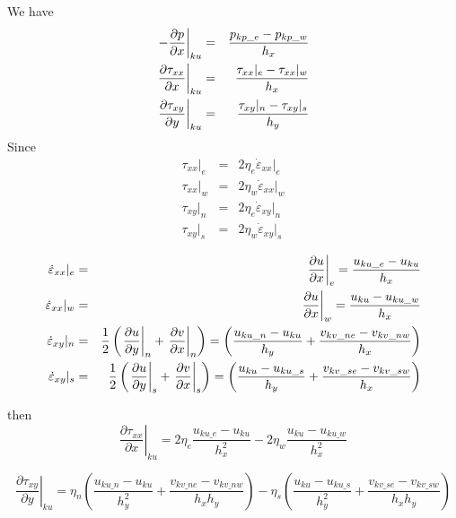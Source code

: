 We have
\begin{eqnarray}
\left. -\frac{\partial p}{\partial x} \right|_{ku} 
&=& \frac{p_{kp\_e}-p_{kp\_w}}{h_x} \nonumber\\
\left. \frac{\partial \tau_{xx}}{\partial x}  \right|_{ku} 
&=&
\frac{\tau_{xx}|_e - \tau_{xx}|_w}{h_x} \nonumber\\
\left. \frac{\partial \tau_{xy}}{\partial y}  \right|_{ku} 
&=&
\frac{\tau_{xy}|_n - \tau_{xy}|_s}{h_y}
\end{eqnarray}
Since
\begin{eqnarray}
\tau_{xx}|_e &=& 2 \eta_e \dot\varepsilon_{xx}|_e \\
\tau_{xx}|_w &=& 2 \eta_w \dot\varepsilon_{xx}|_w \\
\tau_{xy}|_n &=& 2 \eta_e \dot\varepsilon_{xy}|_n \\
\tau_{xy}|_s &=& 2 \eta_w \dot\varepsilon_{xy}|_s
\end{eqnarray}





\begin{eqnarray}
\dot\varepsilon_{xx}|_e 
&=& \left.\frac{\partial u}{\partial x} \right|_e
 =\frac{u_{ku\_e}-u_{ku}  }{h_x}
\nonumber\\
\dot\varepsilon_{xx}|_w 
&=& \left.\frac{\partial u}{\partial x} \right|_w
=\frac{u_{ku}-u_{ku\_w}  }{h_x}
\nonumber\\
\dot\varepsilon_{xy}|_n &=&  
\frac12 \left( 
\left.\frac{\partial u}{\partial y} \right|_n
+ 
\left.\frac{\partial v}{\partial x} \right|_n \right)
=\left(
\frac{u_{ku\_n}-u_{ku}  }{h_y}
+
\frac{v_{kv\_ne}-v_{kv\_nw}  }{h_x}
\right)
\nonumber\\
\dot\varepsilon_{xy}|_s &=& 
\frac12 \left( 
\left.\frac{\partial u}{\partial y} \right|_s
+ 
\left.\frac{\partial v}{\partial x} \right|_s \right)
=\left(
\frac{u_{ku}-u_{ku\_s}  }{h_y}
+
\frac{v_{kv\_se}-v_{kv\_sw}  }{h_x}
\right)
\end{eqnarray}








then
\[
\left. \frac{\partial \tau_{xx}}{\partial x}  \right|_{ku} 
=
2 \eta_e \frac{u_{ku\_e}-u_{ku}  }{h_x^2}
-
2 \eta_w \frac{u_{ku}-u_{ku\_w}  }{h_x^2}
\]

\[
\left. \frac{\partial \tau_{xy}}{\partial y}  \right|_{ku} 
=
 \eta_n \left(
\frac{u_{ku\_n}-u_{ku}  }{h_y^2}
+
\frac{v_{kv\_ne}-v_{kv\_nw}  }{h_xh_y}
\right)
-
 \eta_s \left(
\frac{u_{ku}-u_{ku\_s}  }{h_y^2}
+
\frac{v_{kv\_se}-v_{kv\_sw}  }{h_xh_y}
\right)
\]




